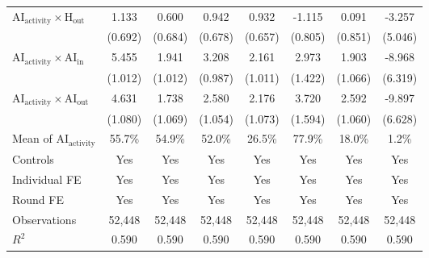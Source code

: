 \begin{table}[H]
\begin{threeparttable}
\begin{tabular}{l*{7}{c}}
\addlinespace
$\mathrm{AI_{activity}} \times \mathrm{H_{out}}$&       1.133         &       0.600         &       0.942         &       0.932         &      -1.115         &       0.091         &      -3.257         \\
            &     (0.692)         &     (0.684)         &     (0.678)         &     (0.657)         &     (0.805)         &     (0.851)         &     (5.046)         \\
\addlinespace
$\mathrm{AI_{activity}} \times \mathrm{AI_{in}}$&       5.455\sym{***}&       1.941\sym{*}  &       3.208\sym{***}&       2.161\sym{**} &       2.973\sym{**} &       1.903\sym{*}  &      -8.968         \\
            &     (1.012)         &     (1.012)         &     (0.987)         &     (1.011)         &     (1.422)         &     (1.066)         &     (6.319)         \\
\addlinespace
$\mathrm{AI_{activity}} \times \mathrm{AI_{out}}$&       4.631\sym{***}&       1.738         &       2.580\sym{**} &       2.176\sym{**} &       3.720\sym{**} &       2.592\sym{**} &      -9.897         \\
            &     (1.080)         &     (1.069)         &     (1.054)         &     (1.073)         &     (1.594)         &     (1.060)         &     (6.628)         \\
\midrule
Mean of $\mathrm{AI_{activity}}$&      55.7\%         &      54.9\%         &      52.0\%         &      26.5\%         &      77.9\%         &      18.0\%         &       1.2\%         \\
Controls    &         Yes         &         Yes         &         Yes         &         Yes         &         Yes         &         Yes         &         Yes         \\
Individual FE&         Yes         &         Yes         &         Yes         &         Yes         &         Yes         &         Yes         &         Yes         \\
Round FE    &         Yes         &         Yes         &         Yes         &         Yes         &         Yes         &         Yes         &         Yes         \\
Observations&      52,448         &      52,448         &      52,448         &      52,448         &      52,448         &      52,448         &      52,448         \\
$R^2$       &       0.590         &       0.590         &       0.590         &       0.590         &       0.590         &       0.590         &       0.590         \\
\bottomrule\bottomrule
\end{tabular}
\end{threeparttable}
\end{table}
